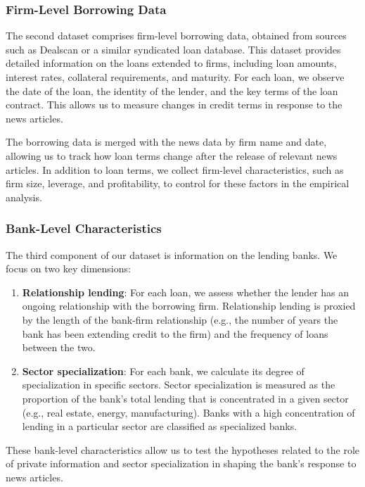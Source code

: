 \subsubsection{Firm-Level Borrowing Data}

The second dataset comprises firm-level borrowing data, obtained from sources such as Dealscan or a similar syndicated loan database. This dataset provides detailed information on the loans extended to firms, including loan amounts, interest rates, collateral requirements, and maturity. For each loan, we observe the date of the loan, the identity of the lender, and the key terms of the loan contract. This allows us to measure changes in credit terms in response to the news articles.

The borrowing data is merged with the news data by firm name and date, allowing us to track how loan terms change after the release of relevant news articles. In addition to loan terms, we collect firm-level characteristics, such as firm size, leverage, and profitability, to control for these factors in the empirical analysis.

\subsubsection{Bank-Level Characteristics}

The third component of our dataset is information on the lending banks. We focus on two key dimensions:
\begin{enumerate}
    \item \textbf{Relationship lending}: For each loan, we assess whether the lender has an ongoing relationship with the borrowing firm. Relationship lending is proxied by the length of the bank-firm relationship (e.g., the number of years the bank has been extending credit to the firm) and the frequency of loans between the two.
    \item \textbf{Sector specialization}: For each bank, we calculate its degree of specialization in specific sectors. Sector specialization is measured as the proportion of the bank's total lending that is concentrated in a given sector (e.g., real estate, energy, manufacturing). Banks with a high concentration of lending in a particular sector are classified as specialized banks.
\end{enumerate}
These bank-level characteristics allow us to test the hypotheses related to the role of private information and sector specialization in shaping the bank's response to news articles.

